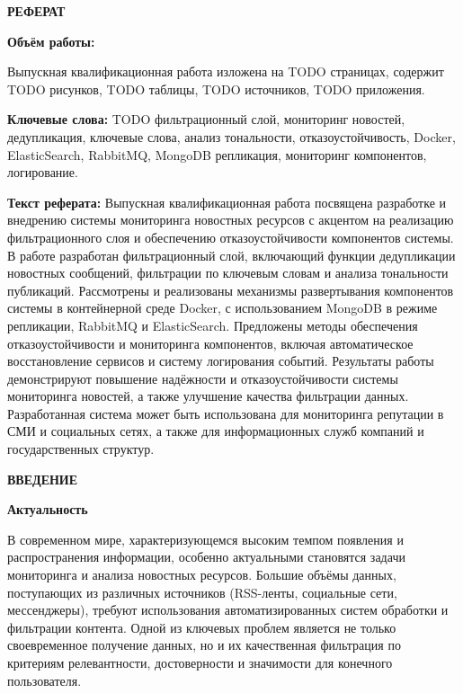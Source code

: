 \newpage
\begin{center}
  \textbf{\large РЕФЕРАТ}
\end{center}

\textbf{Объём работы:}

Выпускная квалификационная работа изложена на {TODO} страницах, содержит {TODO} рисунков, {TODO} таблицы, {TODO} источников, {TODO} приложения.

\textbf{Ключевые слова:}
{TODO}
фильтрационный слой, мониторинг новостей, дедупликация, ключевые слова, анализ тональности, отказоустойчивость, Docker, ElasticSearch, RabbitMQ, MongoDB репликация, мониторинг компонентов, логирование.

\textbf{Текст реферата:}
Выпускная квалификационная работа посвящена разработке и внедрению системы мониторинга новостных ресурсов
с акцентом на реализацию фильтрационного слоя и обеспечению отказоустойчивости компонентов системы.
В работе разработан фильтрационный слой, включающий функции дедупликации новостных сообщений, фильтрации по
ключевым словам и анализа тональности публикаций.
Рассмотрены и реализованы механизмы развертывания компонентов системы в контейнерной среде Docker, с
использованием MongoDB в режиме репликации, RabbitMQ и ElasticSearch.
Предложены методы обеспечения отказоустойчивости и мониторинга компонентов, включая автоматическое
восстановление сервисов и систему логирования событий.
Результаты работы демонстрируют повышение надёжности и отказоустойчивости системы мониторинга новостей,
а также улучшение качества фильтрации данных.
Разработанная система может быть использована для мониторинга репутации в СМИ и социальных сетях,
а также для информационных служб компаний и государственных структур.


\onehalfspacing
\setcounter{page}{2}

\newpage
\renewcommand{\contentsname}{\centerline{\large СОДЕРЖАНИЕ}}
\tableofcontents

\newpage
\begin{center}
  \textbf{\large ВВЕДЕНИЕ}
\end{center}


\textbf{Актуальность}

В современном мире, характеризующемся высоким темпом появления и распространения информации, особенно актуальными
становятся задачи мониторинга и анализа новостных ресурсов. Большие объёмы данных, поступающих из различных источников
(RSS-ленты, социальные сети, мессенджеры), требуют использования автоматизированных систем обработки и фильтрации
контента. Одной из ключевых проблем является не только своевременное получение данных, но и их качественная фильтрация
по критериям релевантности, достоверности и значимости для конечного пользователя.

